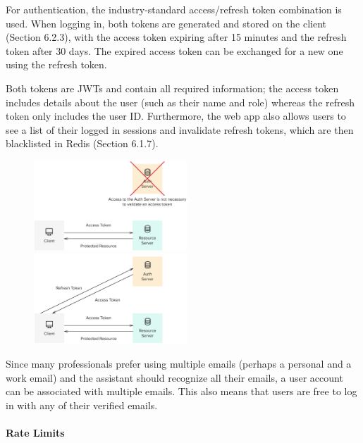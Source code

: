 \documentclass{article}
\begin{document}
For authentication, the industry-standard access/refresh token combination is used. When logging in, both tokens are generated and stored on the client (Section 6.2.3), with the access token expiring after 15 minutes and the refresh token after 30 days. The expired access token can be exchanged for a new one using the refresh token.

Both tokens are JWTs and contain all required information; the access token includes details about the user (such as their name and role) whereas the refresh token only includes the user ID. Furthermore, the web app also allows users to see a list of their logged in sessions and invalidate refresh tokens, which are then blacklisted in Redis (Section 6.1.7).

\begin{figure}[h]
	\centering
	\begin{minipage}{.47\textwidth}
		\centering
		\includegraphics[width=5.75cm]{access-token.png}
	\end{minipage}%
	\hspace{.5cm}
	\begin{minipage}{.47\textwidth}
		\centering
		\includegraphics[width=5.75cm]{refresh-token.png}
	\end{minipage}
\end{figure}

Since many professionals prefer using multiple emails (perhaps a personal and a work email) and the assistant should recognize all their emails, a user account can be associated with multiple emails. This also means that users are free to log in with any of their verified emails.

\paragraph{Rate Limits}
\end{document}
